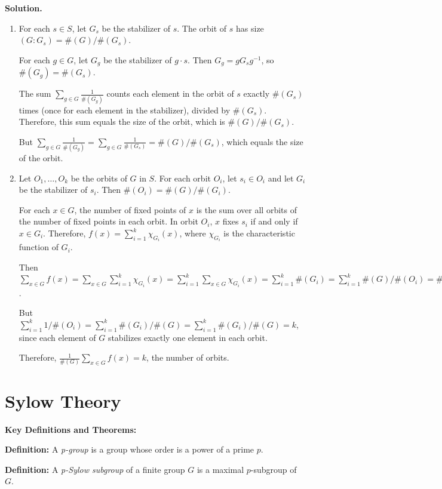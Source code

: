\noindent\textbf{Solution.}
\begin{enumerate}[label=(\alph*)]
\item For each $s \in S$, let $G_s$ be the stabilizer of $s$. The orbit of $s$ has size $(G : G_s) = \#(G)/\#(G_s)$. 

For each $g \in G$, let $G_g$ be the stabilizer of $g \cdot s$. Then $G_g = gG_sg^{-1}$, so $\#(G_g) = \#(G_s)$. 

The sum $\sum_{g \in G} \frac{1}{\#(G_g)}$ counts each element in the orbit of $s$ exactly $\#(G_s)$ times (once for each element in the stabilizer), divided by $\#(G_s)$. Therefore, this sum equals the size of the orbit, which is $\#(G)/\#(G_s)$.

But $\sum_{g \in G} \frac{1}{\#(G_g)} = \sum_{g \in G} \frac{1}{\#(G_s)} = \#(G)/\#(G_s)$, which equals the size of the orbit.

\item Let $O_1, \ldots, O_k$ be the orbits of $G$ in $S$. For each orbit $O_i$, let $s_i \in O_i$ and let $G_i$ be the stabilizer of $s_i$. Then $\#(O_i) = \#(G)/\#(G_i)$.

For each $x \in G$, the number of fixed points of $x$ is the sum over all orbits of the number of fixed points in each orbit. In orbit $O_i$, $x$ fixes $s_i$ if and only if $x \in G_i$. Therefore, $f(x) = \sum_{i=1}^k \chi_{G_i}(x)$, where $\chi_{G_i}$ is the characteristic function of $G_i$.

Then $\sum_{x \in G} f(x) = \sum_{x \in G} \sum_{i=1}^k \chi_{G_i}(x) = \sum_{i=1}^k \sum_{x \in G} \chi_{G_i}(x) = \sum_{i=1}^k \#(G_i) = \sum_{i=1}^k \#(G)/\#(O_i) = \#(G) \sum_{i=1}^k 1/\#(O_i)$.

But $\sum_{i=1}^k 1/\#(O_i) = \sum_{i=1}^k \#(G_i)/\#(G) = \sum_{i=1}^k \#(G_i)/\#(G) = k$, since each element of $G$ stabilizes exactly one element in each orbit.

Therefore, $\frac{1}{\#(G)} \sum_{x \in G} f(x) = k$, the number of orbits.
\end{enumerate}

\section{Sylow Theory}

\textbf{Key Definitions and Theorems:}

\textbf{Definition:} A \textit{p-group} is a group whose order is a power of a prime $p$.

\textbf{Definition:} A \textit{p-Sylow subgroup} of a finite group $G$ is a maximal $p$-subgroup of $G$.

